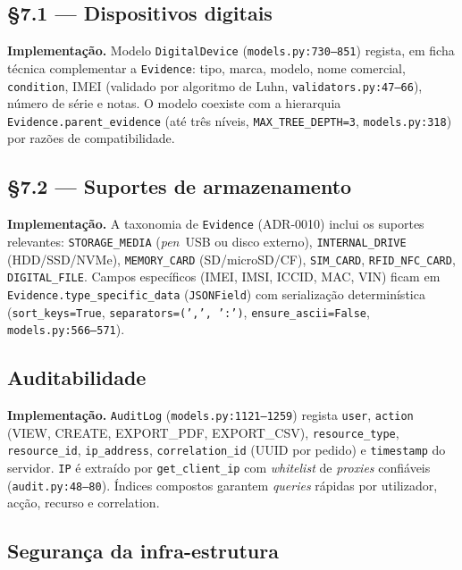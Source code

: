 \documentclass[a4paper,11pt]{article}
\begin{document}
\subsection*{§7.1 --- Dispositivos digitais}

\textbf{Implementação.} Modelo \texttt{DigitalDevice}
(\texttt{models.py:730--851}) regista, em ficha técnica complementar a
\texttt{Evidence}: tipo, marca, modelo, nome comercial,
\texttt{condition}, IMEI (validado por algoritmo de Luhn,
\texttt{validators.py:47--66}), número de série e notas. O
modelo coexiste com a hierarquia
\texttt{Evidence.parent\_evidence} (até três níveis,
\texttt{MAX\_TREE\_DEPTH=3}, \texttt{models.py:318}) por razões de
compatibilidade.

\subsection*{§7.2 --- Suportes de armazenamento}

\textbf{Implementação.} A taxonomia de \texttt{Evidence} (ADR-0010)
inclui os suportes relevantes: \texttt{STORAGE\_MEDIA} (\emph{pen}~USB
ou disco externo), \texttt{INTERNAL\_DRIVE} (HDD/SSD/NVMe),
\texttt{MEMORY\_CARD} (SD/microSD/CF), \texttt{SIM\_CARD},
\texttt{RFID\_NFC\_CARD}, \texttt{DIGITAL\_FILE}. Campos específicos
(IMEI, IMSI, ICCID, MAC, VIN) ficam em
\texttt{Evidence.type\_specific\_data} (\texttt{JSONField}) com
serialização determinística (\texttt{sort\_keys=True},
\texttt{separators=(',', ':')}, \texttt{ensure\_ascii=False},
\texttt{models.py:566--571}).

\subsection*{Auditabilidade}

\textbf{Implementação.} \texttt{AuditLog} (\texttt{models.py:1121--1259})
regista \texttt{user}, \texttt{action} (VIEW, CREATE, EXPORT\_PDF,
EXPORT\_CSV), \texttt{resource\_type}, \texttt{resource\_id},
\texttt{ip\_address}, \texttt{correlation\_id} (UUID por pedido) e
\texttt{timestamp} do servidor. \texttt{IP} é extraído por
\texttt{get\_client\_ip} com \emph{whitelist} de \emph{proxies}
confiáveis (\texttt{audit.py:48--80}). Índices compostos garantem
\emph{queries} rápidas por utilizador, acção, recurso e correlation.

\subsection*{Segurança da infra-estrutura}
\end{document}
